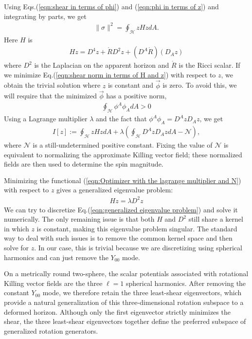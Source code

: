 \documentclass{iopjournal}
\begin{document}
Using Eqs.(\ref{eqn:shear in terms of phi}) and (\ref{eqn:phi in terms of z}) and integrating by parts, we get
\begin{align}
\|\sigma\|^2=\oint_{\mathcal{H}} z H z d A.
\label{eqn:shear norm in terms of H and z}
\end{align}
Here $H$ is
\begin{align}
H z=D^4 z+\mathring{R} D^2 z+(D^A \mathring{R})(D_A z)
\label{eqn:equations for H in terms of laplacians}
\end{align}
where $D^2$ is the Laplacian on the apparent horizon and $\mathring{R}$ is the Ricci scalar. If we minimize Eq.(\ref{eqn:shear norm in terms of H and z}) with respect to $z$, we obtain the trivial solution where $z$ is constant and $\vec{\phi}$ is zero. To avoid this, we will require that the minimized $\vec{\phi}$ has a positive norm,
\begin{align}
\oint_{\mathcal{H}} \phi^A \phi_A d A > 0
\label{eqn:Norm condition to be enforced using Lagrange multiplier}
\end{align}
Using a Lagrange multiplier $\lambda$ and the fact that $\phi^A \phi_A = D^A z D_A z$, we get
\begin{align}
I[z]:=\oint_{\mathcal{H}} z H z d A+\lambda\left(\oint_{\mathcal{H}} D^A z D_A z d A-\mathcal{N}\right),
\label{eqn:Optimizer with the lagrange multiplier and N}
\end{align}
where $\mathcal{N}$ is a still-undetermined positive constant. Fixing the value of $\mathcal{N}$ is equivalent to normalizing the approximate Killing vector field; these normalized fields are then used to determine the spin magnitude.

Minimizing the functional (\ref{eqn:Optimizer with the lagrange multiplier and N}) with respect to $z$ gives a generalized eigenvalue problem:
\begin{align}
  H z = \lambda D^2 z
  \label{eqn:generalized eigenvalue problem}
\end{align}
We can try to discretize Eq.(\ref{eqn:generalized eigenvalue problem}) and solve it numerically. The only remaining issue is that both $H$ and $D^2$ still share a kernel in which $z$ is constant, making this eigenvalue problem singular. The standard way to deal with such issues is to remove the common kernel space and then solve for $z$. In our case, this is trivial because we are discretizing using spherical harmonics and can just remove the $Y_{00}$ mode.

On a metrically round two-sphere, the scalar potentials associated with rotational Killing vector fields are the three $\ell=1$ spherical harmonics. After removing the constant $Y_{00}$ mode, we therefore retain the three least-shear eigenvectors, which provide a natural generalization of this three-dimensional rotation subspace to a deformed horizon. Although only the first eigenvector strictly minimizes the shear, the three least-shear eigenvectors together define the preferred subspace of generalized rotation generators.
\end{document}
